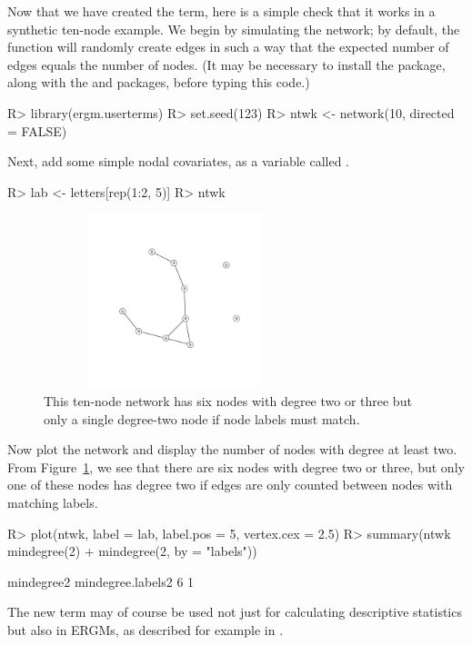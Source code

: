 \documentclass[nojss]{jss}
\begin{document}
Now that we have created the  term, here is a simple check that
it works in a synthetic ten-node example.  We begin by simulating the network;
by default, the  function will randomly create edges in such a way
that the expected number of edges equals the number of nodes.
(It may be necessary to install the  package,
along with the  and  packages, before
typing this code.)
\begin{CodeChunk}
\begin{CodeInput}
R> library(ergm.userterms)
R> set.seed(123)
R> ntwk <- network(10, directed = FALSE)
\end{CodeInput}
\end{CodeChunk}
Next, add some simple nodal covariates, as a variable called .
\begin{CodeChunk}
\begin{CodeInput}
R> lab <- letters[rep(1:2, 5)]
R> ntwk %
\end{CodeInput}
\end{CodeChunk}
\begin{figure}[t!]
\centerline{\includegraphics[height=2in, width=3in]{tennode.pdf}}
\caption{This ten-node network has six nodes with degree
two or three but only a single degree-two node if node
labels must match.}\label{tennodes}
\end{figure}
Now plot the network and display the number of nodes with degree at
least two.  From Figure~\ref{tennodes}, we see that there are six
nodes with degree two or three, but only one of these nodes has
degree two if edges are only counted between nodes
with matching labels.
\begin{CodeChunk}
\begin{CodeInput}
R> plot(ntwk, label = lab, label.pos = 5, vertex.cex = 2.5) 
R> summary(ntwk ~ mindegree(2) + mindegree(2, by = "labels"))
\end{CodeInput}
\begin{CodeOutput}
       mindegree2 mindegree.labels2 
                6                 1 
\end{CodeOutput}
\end{CodeChunk}
The new  term may of course be used not just for
calculating descriptive statistics but also in ERGMs, as described for example
in \citet{ergmjss}.
\end{document}
